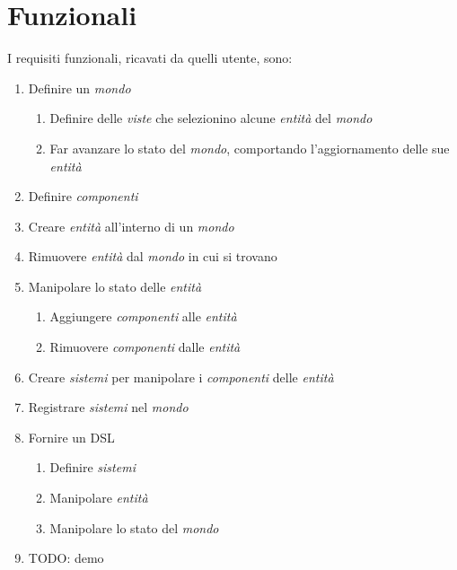 \section{Funzionali}\label{sec:funzionali}
I requisiti funzionali, ricavati da quelli utente, sono:
\begin{enumerate}[label=\textbf{\ref{sec:funzionali}.\arabic*}]
    \item \label{itm:f1} Definire un \textit{mondo}
    \begin{enumerate}[label=\textbf{\ref{itm:f1}.\arabic*}]
        \item \label{itm:ff1} Definire delle \textit{viste} che selezionino alcune \textit{entità} del \textit{mondo}
        \item \label{itm:ff2} Far avanzare lo stato del \textit{mondo}, comportando l'aggiornamento delle sue \textit{entità}
    \end{enumerate}
    \item \label{itm:f2} Definire \textit{componenti}
    \item \label{itm:f3} Creare \textit{entità} all'interno di un \textit{mondo}
    \item \label{itm:f4} Rimuovere \textit{entità} dal \textit{mondo} in cui si trovano
    \item \label{itm:f5} Manipolare lo stato delle \textit{entità}
    \begin{enumerate}[label=\textbf{\ref{itm:f5}.\arabic*}]
        \item \label{itm:ff3} Aggiungere \textit{componenti} alle \textit{entità}
        \item \label{itm:ff4} Rimuovere \textit{componenti} dalle \textit{entità}
    \end{enumerate}
    \item \label{itm:f6} Creare \textit{sistemi} per manipolare i \textit{componenti} delle \textit{entità}
    \item \label{itm:f7} Registrare \textit{sistemi} nel \textit{mondo}
    \item \label{itm:f8} Fornire un DSL
    \begin{enumerate}[label=\textbf{\ref{itm:f8}.\arabic*}]
        \item \label{itm:ff5} Definire \textit{sistemi}
        \item \label{itm:ff6} Manipolare \textit{entità}
        \item \label{itm:ff7} Manipolare lo stato del \textit{mondo}
    \end{enumerate}
    \item TODO: demo %
\end{enumerate}


